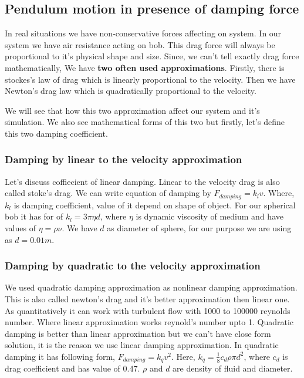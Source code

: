 \documentclass{article}
\begin{document}
\subsection{Pendulum motion in presence of damping force}
\label{sec:orgce24ccf}

In real situations we have non-conservative forces affecting on system. In our system we have air resistance acting on bob. This drag force will always be proportional to it's physical shape and size. Since, we can't tell exactly drag force mathematically, We have \textbf{two often used approximations}. Firstly, there is stockes's law of drag which is linearly proportional to the velocity. Then we have Newton's drag law which is quadratically proportional to the velocity.

We will see that how this two approximation affect our system and it's simulation. We also see mathematical forms of this two but firstly, let's define this two damping coefficient.

\subsubsection{Damping by linear to the velocity approximation}
\label{sec:org55e0b81}

Let's discuss coffiecient of linear damping. Linear to the velocity drag is also called stoke's drag. We can write equation of damping by \(F_{damping} = k_{l}v\). Where, \(k_{l}\) is damping coefficient, value of it depend on shape of object. For our spherical bob it has for of \(k_{l} = 3\pi\eta d\), where \(\eta\) is dynamic viscosity of medium and have values of \(\eta = \rho \nu\). We have \(d\) as diameter of sphere, for our purpose we are using as \(d=0.01m\). 

\subsubsection{Damping by quadratic to the velocity approximation}
\label{sec:org45f4934}

We used quadratic damping approximation as nonlinear damping approximation. This is also called newton's drag and it's better approximation then linear one. As quantitatively it can work with turbulent flow with 1000 to 100000 reynolds number. Where linear approximation works reynold's number upto 1. Quadratic damping is better than linear approximation but we can't have close form solution, it is the reason we use linear damping approximation. In quadratic damping it has following form, \(F_{damping} = k_{q} v^{2}\). Here, \(k_{q} = \frac{1}{8}c_{d}\rho \pi d^{2}\), where \(c_{d}\) is drag coefficient and has value of 0.47. \(\rho\) and \(d\) are density of fluid and diameter.\cite{lubarda2021analysis}\cite{goossens2019review}
\end{document}
